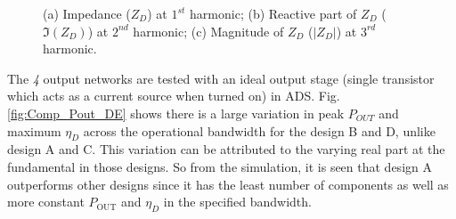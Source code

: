 \documentclass[conference]{IEEEtran}
\begin{document}
\begin{figure}[!t]
\begin{subfigure}{0.24\textwidth}
\caption{}
\label{fig:Comp_3H_Mag}
\end{subfigure}
\caption{(a) Impedance ($Z_D$) at $1^{st}$ harmonic; (b) Reactive part of $Z_D$ ($\Im(Z_D)$) at $2^{nd}$ harmonic; (c) Magnitude of $Z_D$ ($|Z_D|$) at $3^{rd}$ harmonic.}
\label{fig:Comp_1H_2H_3H}
\vspace{-0.1in}
\end{figure}


The \textit{4} output networks are tested with an ideal output stage (single transistor which acts as a current source when turned on) in ADS. Fig. \ref{fig:Comp_Pout_DE} shows there is a large variation in peak $P_{OUT}$ and maximum $\eta_D$ across the operational bandwidth for the design B and D, unlike design A and C. This variation can be attributed to the varying real part at the fundamental in those designs.
So from the simulation, it is seen that design A outperforms other designs since it has the least number of components as well as more constant $P_{\text{OUT}}$ and $\eta_D$ in the specified bandwidth.
\end{document}
